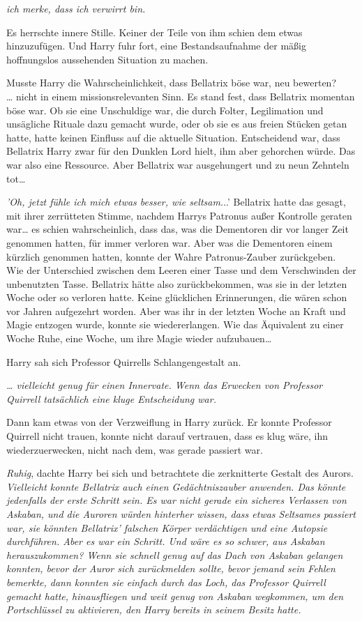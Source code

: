{\emph{ich merke, dass ich verwirrt bin.}

Es herrschte innere Stille. Keiner der Teile von ihm schien dem etwas hinzuzufügen. Und Harry fuhr fort, eine Bestandsaufnahme der mäßig hoffnungslos aussehenden Situation zu machen.

Musste Harry die Wahrscheinlichkeit, dass Bellatrix böse war, neu bewerten?\\ … nicht in einem missionsrelevanten Sinn. Es stand fest, dass Bellatrix momentan böse war. Ob sie eine Unschuldige war, die durch Folter, Legilimation und unsägliche Rituale dazu gemacht wurde, oder ob sie es aus freien Stücken getan hatte, hatte keinen Einfluss auf die aktuelle Situation. Entscheidend war, dass Bellatrix Harry zwar für den Dunklen Lord hielt, ihm aber gehorchen würde. Das war also eine Ressource. Aber Bellatrix war ausgehungert und zu neun Zehnteln tot…

\emph{'Oh, jetzt fühle ich mich etwas besser, wie seltsam.}..' Bellatrix hatte das gesagt, mit ihrer zerrütteten Stimme, nachdem Harrys Patronus außer Kontrolle geraten war… es schien wahrscheinlich, dass das, was die Dementoren dir vor langer Zeit genommen hatten, für immer verloren war. Aber was die Dementoren einem kürzlich genommen hatten, konnte der Wahre Patronus-Zauber zurückgeben.\\ Wie der Unterschied zwischen dem Leeren einer Tasse und dem Verschwinden der unbenutzten Tasse. Bellatrix hätte also zurückbekommen, was sie in der letzten Woche oder so verloren hatte. Keine glücklichen Erinnerungen, die wären schon vor Jahren aufgezehrt worden. Aber was ihr in der letzten Woche an Kraft und Magie entzogen wurde, konnte sie wiedererlangen. Wie das Äquivalent zu einer Woche Ruhe, eine Woche, um ihre Magie wieder aufzubauen…

Harry sah sich Professor Quirrells Schlangengestalt an.

\emph{… vielleicht genug für einen Innervate. Wenn das Erwecken von Professor Quirrell tatsächlich eine kluge Entscheidung war.}

Dann kam etwas von der Verzweiflung in Harry zurück. Er konnte Professor Quirrell nicht trauen, konnte nicht darauf vertrauen, dass es klug wäre, ihn wiederzuerwecken, nicht nach dem, was gerade passiert war.

\emph{Ruhig}, dachte Harry bei sich und betrachtete die zerknitterte Gestalt des Aurors. \emph{Vielleicht konnte Bellatrix auch einen Gedächtniszauber anwenden. Das könnte jedenfalls der erste Schritt sein. Es war nicht gerade ein sicheres Verlassen von Askaban, und die Auroren würden hinterher wissen, dass etwas Seltsames passiert war, sie könnten Bellatrix' falschen Körper verdächtigen und eine Autopsie durchführen. Aber es war ein Schritt. Und wäre es so schwer, aus Askaban herauszukommen? Wenn sie schnell genug auf das Dach von Askaban gelangen konnten, bevor der Auror sich zurückmelden sollte, bevor jemand sein Fehlen bemerkte, dann konnten sie einfach durch das Loch, das Professor Quirrell gemacht hatte, hinausfliegen und weit genug von Askaban wegkommen, um den Portschlüssel zu aktivieren, den Harry bereits in seinem Besitz hatte.}

}
